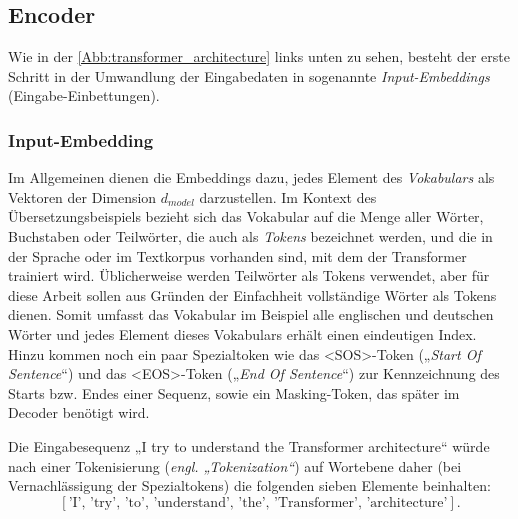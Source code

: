 \subsection*{Encoder}
Wie in der \cref{Abb:transformer_architecture} links unten zu sehen, besteht der erste Schritt in der Umwandlung der Eingabedaten in sogenannte \emph{Input-Embeddings} (Eingabe-Einbettungen). 

\subsubsection*{Input-Embedding}

Im Allgemeinen dienen die Embeddings dazu, jedes Element des \emph{Vokabulars} als Vektoren der Dimension $d_{model}$ darzustellen. Im Kontext des Übersetzungsbeispiels bezieht sich das Vokabular auf die Menge aller Wörter, Buchstaben oder Teilwörter, die auch als \emph{Tokens} bezeichnet werden, und die in der Sprache oder im Textkorpus vorhanden sind, mit dem der Transformer trainiert wird. Üblicherweise werden Teilwörter als Tokens verwendet, aber für diese Arbeit sollen aus Gründen der Einfachheit vollständige Wörter als Tokens dienen. Somit umfasst das Vokabular im Beispiel alle englischen und deutschen Wörter und jedes Element dieses Vokabulars erhält einen eindeutigen Index. Hinzu kommen noch ein paar Spezialtoken wie das <SOS>-Token („\emph{Start Of Sentence}“) und das <EOS>-Token („\emph{End Of Sentence}“) zur Kennzeichnung des Starts bzw. Endes einer Sequenz, sowie ein Masking-Token, das später im Decoder benötigt wird. \cite{Formal_Algorithms_for_Transformers_DeepMind}

Die Eingabesequenz „I try to understand the Transformer architecture“ würde nach einer Tokenisierung (\emph{engl. „Tokenization“}) auf Wortebene daher (bei Vernachlässigung der Spezialtokens) die folgenden sieben Elemente beinhalten:
$$[\text{'I', 'try', 'to', 'understand', 'the', 'Transformer', 'architecture'}].$$

